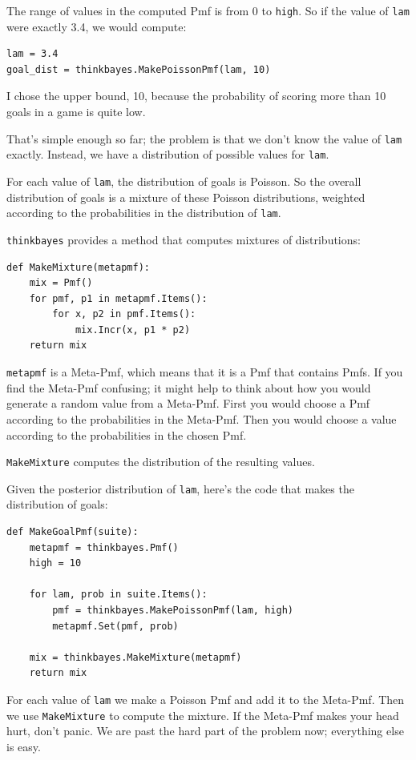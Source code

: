 \documentclass[12pt]{book}
\begin{document}
The range of values in the computed Pmf is from 0 to {\tt high}.
So if the value of {\tt lam} were exactly 3.4, we would compute:

\begin{verbatim}
lam = 3.4
goal_dist = thinkbayes.MakePoissonPmf(lam, 10)
\end{verbatim}

I chose the upper bound, 10, because the probability of scoring
more than 10 goals in a game is quite low.

That's simple enough so far; the problem is that we don't know
the value of {\tt lam} exactly.  Instead, we have a distribution
of possible values for {\tt lam}.

For each value of {\tt lam}, the distribution of goals is Poisson.
So the overall distribution of goals is a mixture of these
Poisson distributions, weighted according to the probabilities
in the distribution of {\tt lam}.

\verb"thinkbayes" provides a method that computes mixtures
of distributions:

\begin{verbatim}
def MakeMixture(metapmf):
    mix = Pmf()
    for pmf, p1 in metapmf.Items():
        for x, p2 in pmf.Items():
            mix.Incr(x, p1 * p2)
    return mix
\end{verbatim}  

{\tt metapmf} is a Meta-Pmf, which means that it is a Pmf that
contains Pmfs.  If you find the Meta-Pmf confusing; it might
help to think about how you would generate a random value from
a Meta-Pmf.  First you would choose a Pmf according to the
probabilities in the Meta-Pmf.  Then you would choose a value
according to the probabilities in the chosen Pmf.

\verb"MakeMixture" computes the distribution of the resulting
values.

Given the posterior distribution of {\tt lam}, here's the code
that makes the distribution of goals:

\begin{verbatim}
def MakeGoalPmf(suite):
    metapmf = thinkbayes.Pmf()
    high = 10

    for lam, prob in suite.Items():
        pmf = thinkbayes.MakePoissonPmf(lam, high)
        metapmf.Set(pmf, prob)

    mix = thinkbayes.MakeMixture(metapmf)
    return mix
\end{verbatim}  

For each value of {\tt lam} we make a Poisson Pmf and add it to the
Meta-Pmf.  Then we use \verb"MakeMixture" to compute the mixture.  If
the Meta-Pmf makes your head hurt, don't panic.  We are past the hard
part of the problem now; everything else is easy.
\end{document}
